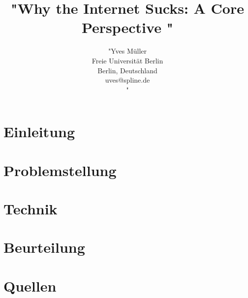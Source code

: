 \documentclass[11pt,a4paper]{article}
\author{"Yves Müller \\ Freie Universität Berlin \\ Berlin, Deutschland \\ uves@spline.de \\ "}
\title{"Why the Internet Sucks: A Core Perspective "}
\date{}
\begin{document}
\maketitle

\tableofcontents

\section{Einleitung}


\section{Problemstellung}


\section{Technik}


\section{Beurteilung}


\section{Quellen}

\end{document}
